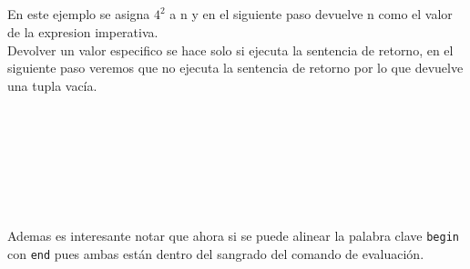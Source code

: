       \begin{fxcode}
         \\
         \\
         \\
         \\
      \end{fxcode}
      
      En este ejemplo se asigna $4^2$ a n y en el siguiente paso devuelve n como el valor de la expresion imperativa.
      \\
      
      Devolver un valor especifico se hace solo si ejecuta la sentencia de retorno, en el siguiente paso veremos que no ejecuta la sentencia de retorno por lo que devuelve una tupla vacía.
      
      \begin{fxcode}
         \\
         \\
         \\
         \\
         \\
         \\
         \outcode{()}
      \end{fxcode}
      
      Ademas es interesante notar que ahora si se puede alinear la palabra clave \texttt{begin} con \texttt{end} pues ambas están dentro del sangrado del comando de evaluación.
      
      \begin{fxcode}
         \\
         \\
         \\
         \\
         \\
         \\
      \end{fxcode}
      
